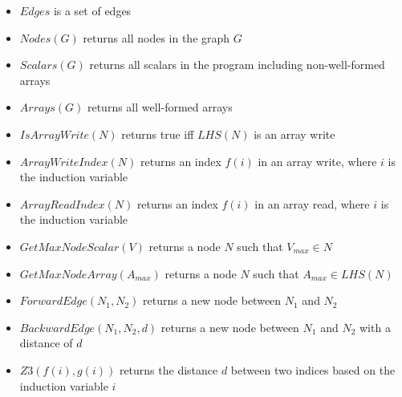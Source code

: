 \begin{itemize}
	\item $\mathit{Edges}$ is a set of edges
	\item $\mathit{Nodes}(G)$ returns all nodes in the graph $G$
	\item $\mathit{Scalars}(G)$ returns all scalars in the program including non-well-formed arrays
	\item $\mathit{Arrays}(G)$ returns all well-formed arrays
	\item $\mathit{IsArrayWrite}(N)$ returns true iff $\mathit{LHS}(N)$ is an array write
	\item $\mathit{ArrayWriteIndex}(N)$ returns an index $f(i)$ in an array write, where $i$ is the induction variable
	\item $\mathit{ArrayReadIndex}(N)$ returns an index $f(i)$ in an array read, where $i$ is the induction variable
	\item $\mathit{GetMaxNodeScalar}(V)$ returns a node $N$ such that $V_{\mathit{max}} \in N$
	\item $\mathit{GetMaxNodeArray}(A_{\mathit{max}})$ returns a node $N$ such that $A_{\mathit{max}} \in \mathit{LHS}(N)$
	\item $\mathit{ForwardEdge}(N_1, N_2)$ returns a new node between $N_1$ and $N_2$
	\item $\mathit{BackwardEdge}(N_1, N_2, d)$ returns a new node between $N_1$ and $N_2$ with a distance of $d$
	\item $\mathit{Z3}(f(i), g(i))$ returns the distance $d$ between two indices based on the induction variable $i$
\end{itemize}





